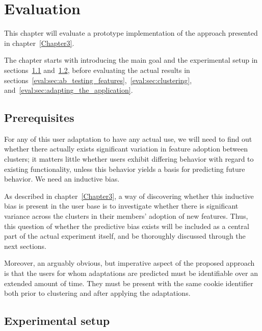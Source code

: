 \chapter{Evaluation}

\label{Chapter4}


This chapter will evaluate a prototype implementation of the approach presented in chapter~\ref{Chapter3}.

The chapter starts with introducing the main goal and the experimental setup in sections~\ref{eval:sec:prerequisites} and~\ref{eval:sec:experimental_setup},
before evaluating the actual results in sections~\ref{eval:sec:ab_testing_features},~\ref{eval:sec:clustering}, and~\ref{eval:sec:adapting_the_application}.

\section{Prerequisites} %
\label{eval:sec:prerequisites}

For any of this user adaptation to have any actual use, we will need to find out whether there actually exists significant variation in feature adoption between clusters; it matters little whether users exhibit differing behavior with regard to existing functionality, unless this behavior yields a basis for predicting future behavior. We need an inductive bias.

As described in chapter~\ref{Chapter3}, a way of discovering whether this inductive bias is present in the user base is to investigate whether there is significant variance across the clusters in their members' adoption of new features. Thus, this question of whether the predictive bias exists will be included as a central part of the actual experiment itself, and be thoroughly discussed through the next sections.

Moreover, an arguably obvious, but imperative aspect of the proposed approach is that the users for whom adaptations are predicted must be identifiable over an extended amount of time. They must be present with the same cookie identifier both prior to clustering and after applying the adaptations.

\section{Experimental setup} %
\label{eval:sec:experimental_setup}

